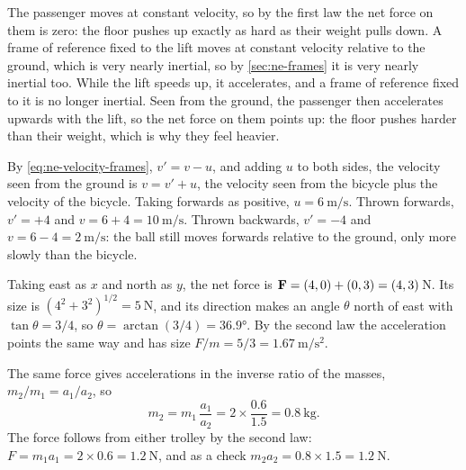 \label{sec:ne-solutions}

The passenger moves at constant velocity, so by
the first law the net force on them is zero: the floor pushes up exactly
as hard as their weight pulls down. A frame of reference fixed to the
lift moves at constant velocity relative to the ground, which is very
nearly inertial, so by \cref{sec:ne-frames} it is very nearly inertial
too. While the
lift speeds up, it accelerates, and a frame of reference fixed to it is
no longer inertial. Seen from the ground, the passenger then accelerates
upwards with the lift, so the net force on them points up: the floor
pushes harder than their weight, which is why they feel heavier.

By \cref{eq:ne-velocity-frames}, $v' = v - u$,
and adding $u$ to both sides, the velocity seen from the ground is $v =
v' + u$, the velocity seen from the bicycle plus the velocity of the
bicycle. Taking forwards as positive, $u =
\SI{6}{\metre\per\second}$. Thrown forwards, $v' = +4$ and $v = 6 + 4 =
\SI{10}{\metre\per\second}$. Thrown backwards, $v' = -4$ and $v = 6 - 4 =
\SI{2}{\metre\per\second}$: the ball still moves forwards relative to the
ground, only more slowly than the bicycle.

Taking east as $x$ and north as $y$, the net force
is $\bm{\mathrm{F}} = (4, 0) + (0, 3) = (4, 3)$\,\si{\newton}. Its size is $(4^2 +
3^2)^{1/2} = \SI{5}{\newton}$, and its direction makes an angle $\theta$
north of east with $\tan\theta = 3/4$, so $\theta = \arctan(3/4) =
\ang{36.9}$. By the second law the acceleration points the same way and
has size $F/m = 5/3 = \SI{1.67}{\metre\per\second\squared}$.

The same force gives accelerations in the inverse
ratio of the masses, $m_2/m_1 = a_1/a_2$, so
\begin{equation*}
   m_2 = m_1\,\frac{a_1}{a_2} = 2\times\frac{0.6}{1.5}
   = \SI{0.8}{\kilogram} .
\end{equation*}
The force follows from either trolley by the second law: $F = m_1 a_1 =
2\times0.6 = \SI{1.2}{\newton}$, and as a check $m_2 a_2 = 0.8\times1.5 =
\SI{1.2}{\newton}$.


